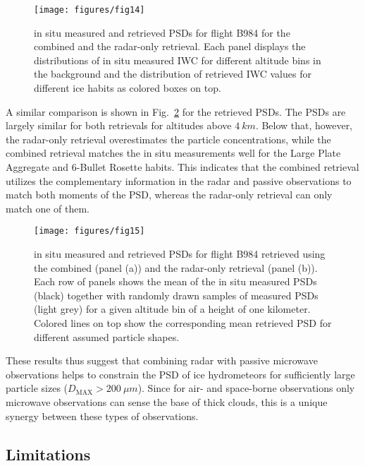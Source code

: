 \documentclass[journal abbreviation, manuscript]{copernicus}
\begin{document}
\begin{figure}[!hbpt]
  \centering
  \texttt{[image: figures/fig14]}
  \caption{in situ measured and retrieved PSDs for flight B984
    for the combined and the radar-only retrieval. Each panel displays
    the distributions of in situ measured IWC for different altitude
    bins in the background and the distribution of retrieved IWC values
    for different ice habits as colored boxes on top.}
  \label{fig:in_situ_iwc_radar_only}
\end{figure}

A similar comparison is shown in Fig.~\ref{fig:in_situ_psds_radar_only} for the
retrieved PSDs. The PSDs are largely similar for both retrievals for altitudes
above $4\ \unit{km}$. Below that, however, the radar-only retrieval
overestimates the particle concentrations, while the combined retrieval matches
the in situ measurements well for the Large Plate Aggregate and 6-Bullet Rosette
habits. This indicates that the combined retrieval utilizes the complementary
information in the radar and passive observations to match both moments of the
PSD, whereas the radar-only retrieval can only match one of them.

\begin{figure}[!hbpt]
  \centering
  \texttt{[image: figures/fig15]}
  \caption{in situ measured and retrieved PSDs for flight B984
    retrieved using the combined (panel (a)) and the radar-only retrieval
    (panel (b)). Each row of panels shows the mean of the in situ measured
    PSDs (black) together with randomly drawn samples of measured PSDs
    (light grey) for a given altitude bin of a height of one kilometer.
    Colored lines on top show the corresponding mean retrieved PSD for
    different assumed particle shapes.}
  \label{fig:in_situ_psds_radar_only}
\end{figure}

These results thus suggest that combining radar with passive microwave
observations helps to constrain the PSD of ice hydrometeors for sufficiently
large particle sizes ($D_\text{MAX} > 200\ \unit{\mu m}$). Since for air- and
space-borne observations only microwave observations can sense the base of thick
clouds, this is a unique synergy between these types of observations.

\subsection{Limitations}
\end{document}
